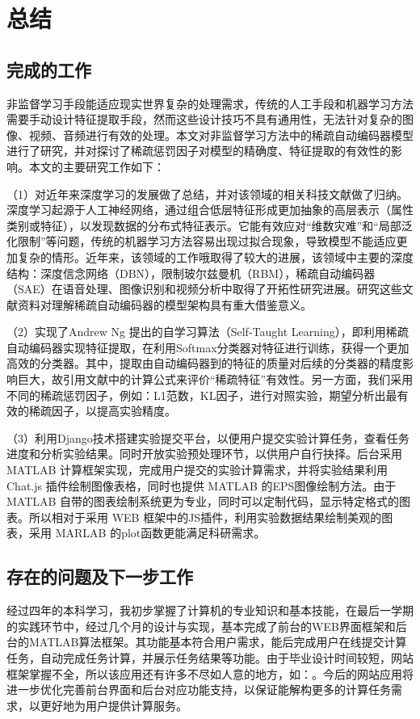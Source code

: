 \documentclass[oneside]{ZJUthesis}
\begin{document}
\chapter{总结}
\section{完成的工作}
非监督学习手段能适应现实世界复杂的处理需求，传统的人工手段和机器学习方法需要手动设计特征提取手段，然而这些设计技巧不具有通用性，无法针对复杂的图像、视频、音频进行有效的处理。本文对非监督学习方法中的稀疏自动编码器模型进行了研究，并对探讨了稀疏惩罚因子对模型的精确度、特征提取的有效性的影响。本文的主要研究工作如下：

（1）对近年来深度学习的发展做了总结，并对该领域的相关科技文献做了归纳。深度学习起源于人工神经网络，通过组合低层特征形成更加抽象的高层表示（属性类别或特征），以发现数据的分布式特征表示。它能有效应对``维数灾难''和``局部泛化限制''等问题，传统的机器学习方法容易出现过拟合现象，导致模型不能适应更加复杂的情形。近年来，该领域的工作哦取得了较大的进展，该领域中主要的深度结构：深度信念网络（DBN），限制玻尔兹曼机（RBM），稀疏自动编码器（SAE）在语音处理、图像识别和视频分析中取得了开拓性研究进展。研究这些文献资料对理解稀疏自动编码器的模型架构具有重大借鉴意义。

（2）实现了Andrew Ng 提出的自学习算法（Self-Taught Learning），即利用稀疏自动编码器实现特征提取，在利用Softmax分类器对特征进行训练，获得一个更加高效的分类器。其中，提取由自动编码器到的特征的质量对后续的分类器的精度影响巨大，故引用文献中的计算公式来评价``稀疏特征''有效性。另一方面，我们采用不同的稀疏惩罚因子，例如：L1范数，KL因子，进行对照实验，期望分析出最有效的稀疏因子，以提高实验精度。

（3）利用Django技术搭建实验提交平台，以便用户提交实验计算任务，查看任务进度和分析实验结果。同时开放实验预处理环节，以供用户自行抉择。后台采用 MATLAB 计算框架实现，完成用户提交的实验计算需求，并将实验结果利用 Chat.js 插件绘制图像表格，同时也提供 MATLAB 的EPS图像绘制方法。由于 MATLAB 自带的图表绘制系统更为专业，同时可以定制代码，显示特定格式的图表。所以相对于采用 WEB 框架中的JS插件，利用实验数据结果绘制美观的图表，采用 MARLAB 的plot函数更能满足科研需求。


\section{存在的问题及下一步工作}
经过四年的本科学习，我初步掌握了计算机的专业知识和基本技能，在最后一学期的实践环节中，经过几个月的设计与实现，基本完成了前台的WEB界面框架和后台的MATLAB算法框架。其功能基本符合用户需求，能后完成用户在线提交计算任务，自动完成任务计算，并展示任务结果等功能。由于毕业设计时间较短，网站框架掌握不全，所以该应用还有许多不尽如人意的地方，如：。今后的网站应用将进一步优化完善前台界面和后台对应功能支持，以保证能解构更多的计算任务需求，以更好地为用户提供计算服务。
\end{document}
